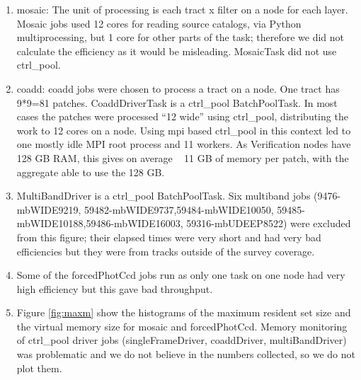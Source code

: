\documentclass[DM,authoryear,toc]{lsstdoc}
\begin{document}
\begin{enumerate}
\item
mosaic: The unit of processing is each tract x filter on a node for each layer.  Mosaic jobs used 12 cores for reading source catalogs, via Python multiprocessing, but 1 core for other parts of the task; therefore we did not calculate the efficiency as it would be misleading. MosaicTask did not use ctrl{\_}pool.
\item
coadd: coadd jobs were chosen to process a tract on a node. One tract has 9*9=81 patches. CoaddDriverTask is a ctrl{\_}pool  BatchPoolTask. In most cases the patches were processed “12 wide” using ctrl{\_}pool, distributing the work to 12 cores on a node. Using mpi based ctrl{\_}pool in this context led to one mostly idle MPI root process and 11 workers.  As Verification nodes have 128 GB RAM, this gives on average ~ 11 GB of memory per patch, with the aggregate  able to use the 128 GB.
\item
MultiBandDriver is a ctrl{\_}pool  BatchPoolTask.
Six multiband jobs (9476-mbWIDE9219, 59482-mbWIDE9737,59484-mbWIDE10050, 59485-mbWIDE10188,59486-mbWIDE16003, 59316-mbUDEEP8522) were excluded from this figure; their elapsed times were very short and had very bad efficiencies but they were from tracks outside of the survey coverage.
\item
Some of the forcedPhotCcd jobs run as only one task on one node had very high efficiency but this gave bad throughput.
\item
Figure \ref{fig:maxm} show the histograms of the maximum resident set size and the virtual memory size for mosaic and forcedPhotCcd. Memory monitoring of ctrl{\_}pool driver jobs (singleFrameDriver, coaddDriver, multiBandDriver) was problematic and we do not believe in the numbers collected, so we do not plot them.


\end{enumerate}
\end{document}
